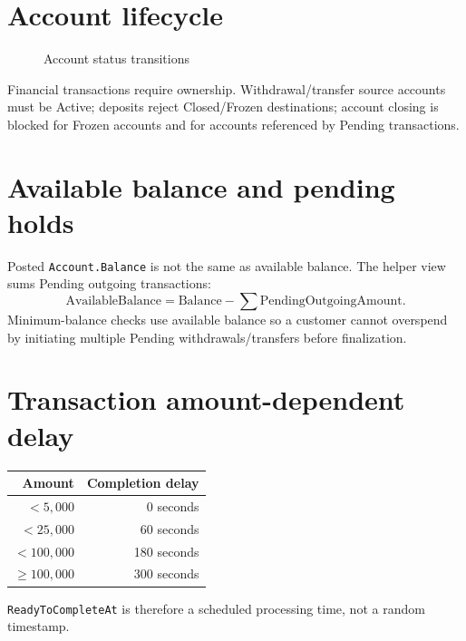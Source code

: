 \documentclass[11pt,a4paper,oneside]{report}
\begin{document}
\section{Account lifecycle}
\begin{figure}[H]
\centering
{}
\caption{Account status transitions}
\end{figure}
Financial transactions require ownership. Withdrawal/transfer source accounts must be Active; deposits reject Closed/Frozen destinations; account closing is blocked for Frozen accounts and for accounts referenced by Pending transactions.

\section{Available balance and pending holds}
Posted \texttt{Account.Balance} is not the same as available balance. The helper view sums Pending outgoing transactions:
\[
\text{AvailableBalance}=\text{Balance}-\sum \text{PendingOutgoingAmount}.
\]
Minimum-balance checks use available balance so a customer cannot overspend by initiating multiple Pending withdrawals/transfers before finalization.

\section{Transaction amount-dependent delay}
\begin{center}
\begin{tabular}{rr}
\toprule\textbf{Amount} & \textbf{Completion delay}\\\midrule
$<5{,}000$ & 0 seconds\\
$<25{,}000$ & 60 seconds\\
$<100{,}000$ & 180 seconds\\
$\ge 100{,}000$ & 300 seconds\\
\bottomrule
\end{tabular}
\end{center}
\texttt{ReadyToCompleteAt} is therefore a scheduled processing time, not a random timestamp.
\end{document}
